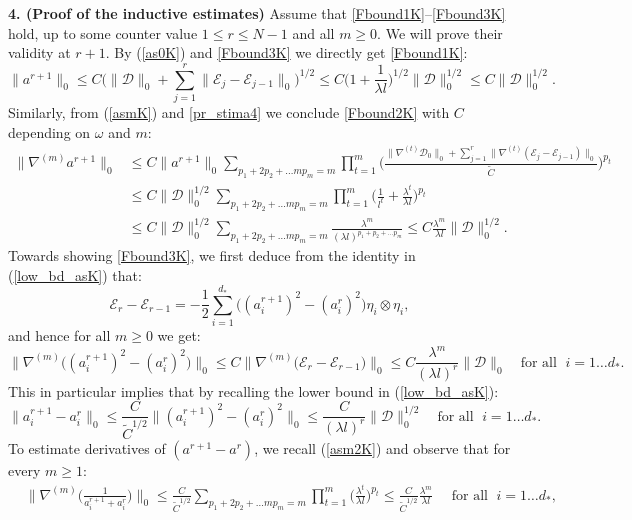 \documentclass[reqno,twoside,11pt]{amsart}
\numberwithin{equation}{section}
\theoremstyle{plain}
\theoremstyle{definition}
\begin{document}
{\bf 4. (Proof of the inductive estimates)} Assume
that \ref{Fbound1K}--\ref{Fbound3K} hold, up to some counter value
$1\leq r\leq N-1$ and all $m\geq 0$. We will prove their validity at
$r+1$. By (\ref{as0K}) and \ref{Fbound3K} we directly get \ref{Fbound1K}:
$$\|a^{r+1}\|_0\leq C\Big(\|\mathcal{D}\|_0 +
\sum_{j=1}^{r}\|\mathcal{E}_j - \mathcal{E}_{j-1}\|_0\Big)^{1/2}\leq C
\big( 1+ \frac{1}{\lambda l}\big)^{1/2} \|\mathcal{D}\|_0^{1/2}\leq 
C \|\mathcal{D}\|_0^{1/2}.$$
Similarly, from (\ref{asmK}) and \ref{pr_stima4} we conclude \ref{Fbound2K} with $C$
depending on $\omega$ and $m$:
\begin{equation*}
\begin{split}
\|\nabla^{(m)}a^{r+1}\|_0 & \leq C \|a^{r+1}\|_0\sum_{p_1+2p_2+\ldots mp_m=m}\prod_{t=1}^m
\Big(\frac{\|\nabla^{(t)}\mathcal{D}_0\|_0 +
  \sum_{j=1}^r\|\nabla^{(t)}(\mathcal{E}_{j} - \mathcal{E}_{j-1})\|_0}{\tilde C}\Big)^{p_t}
\\ & \leq C \|\mathcal{D}\|_0^{1/2} \sum_{p_1+2p_2+\ldots mp_m=m}\prod_{t=1}^m
\Big(\frac{1}{l^t}+\frac{\lambda^t}{\lambda l}\Big)^{p_t} \\ & \leq 
C \|\mathcal{D}\|_0^{1/2} \sum_{p_1+2p_2+\ldots mp_m=m}
\frac{\lambda^m}{(\lambda l)^{p_1+p_2+\ldots p_m}}\leq 
C\frac{\lambda^{m}}{\lambda l}\|\mathcal{D}\|_0^{1/2}.
\end{split}
\end{equation*}
Towards showing \ref{Fbound3K}, we first deduce from the identity in (\ref{low_bd_asK}) that:
$$\mathcal{E}_{r}-\mathcal{E}_{r-1} = -\frac{1}{2}\sum_{i=1}^{d_*}
\big((a_i^{r+1})^2-(a_i^{r})^2\big) \eta_i\otimes \eta_i,$$
and hence for all $m\geq 0$ we get:
\begin{equation}\label{muK}
\|\nabla^{(m)} \big((a_i^{r+1})^2-(a_i^{r})^2\big)\|_0\leq
C \|\nabla^{(m)}\big(\mathcal{E}_{r}-\mathcal{E}_{r-1}\big) \|_0\leq
C\frac{\lambda^{m}}{(\lambda l)^{r}}\|\mathcal{D}\|_0 \quad\mbox{
  for all }\; i=1\ldots d_*.
\end{equation}
This in particular implies that by recalling the lower bound in (\ref{low_bd_asK}):
\begin{equation}\label{mu1K}
\|{a^{r+1}_i-a^{r}_i}\|_0 \leq \frac{C}{\tilde C^{1/2}}\|(a_i^{r+1})^2-(a_i^{r})^2\|_0
\leq \frac{C}{(\lambda l)^{r}}\|\mathcal{D}\|_0^{1/2} \quad\mbox{
  for all }\; i=1\ldots d_*.
\end{equation}
To estimate derivatives of $(a^{r+1}-a^{r})$, we recall (\ref{asm2K})
and observe that for every $m\geq 1$:
\begin{equation*}
\begin{split}
& \|\nabla^{(m)}\Big(\frac{1}{a^{r+1}_i+a^{r}_i}\Big)\|_0 \leq \frac{C}{\tilde
C^{1/2}} \sum_{p_1+2p_2+\ldots mp_m=m}\prod_{t=1}^m
\Big(\frac{\lambda^t}{\lambda l}\Big)^{p_t} \leq \frac{C}{\tilde C^{1/2}} 
\frac{\lambda^m}{\lambda l} \quad\mbox{ for all }\; i=1\ldots d_*,
\end{split}
\end{equation*}
\end{document}
